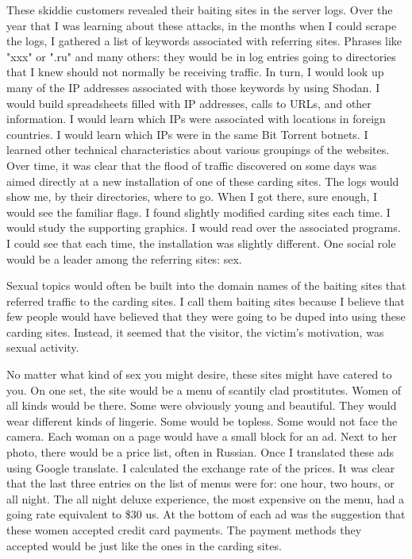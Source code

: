 These skiddie customers revealed their baiting sites in the server logs.  Over the year that I was learning about these attacks, in the months when I could scrape the logs, I gathered a list of keywords associated with referring sites.  Phrases like "xxx" or ".ru" and many others:  they would be in log entries going to directories that I knew should not normally be receiving traffic.  In turn, I would look up many of the IP addresses associated with those keywords by using Shodan.  I would build spreadsheets filled with IP addresses, calls to URLs, and other information.  I would learn which IPs were associated with locations in foreign countries.  I would learn which IPs were in the same Bit Torrent botnets.  I learned other technical characteristics about various groupings of the websites.  Over time, it was clear that the flood of traffic discovered on some days was aimed directly at a new installation of one of these carding sites.  The logs would show me, by their directories, where to go.  When I got there, sure enough, I would see the familiar flags.  I found slightly modified carding sites each time.  I would study the supporting graphics.  I would read over the associated programs.  I could see that each time, the installation was slightly different.  One social role would be a leader among the referring sites:  sex.

Sexual topics would often be built into the domain names of the baiting sites that referred traffic to the carding sites.  I call them baiting sites because I believe that few people would have believed that they were going to be duped into using these carding sites.  Instead, it seemed that the visitor, the victim's motivation, was sexual activity.

No matter what kind of sex you might desire, these sites might have catered to you.  On one set, the site would be a menu of scantily clad prostitutes.  Women of all kinds would be there.  Some were obviously young and beautiful.  They would wear different kinds of lingerie.  Some would be topless.  Some would not face the camera.  Each woman on a page would have a small block for an ad.  Next to her photo, there would be a price list, often in Russian.  Once I translated these ads using Google translate.  I calculated the exchange rate of the prices.  It was clear that the last three entries on the list of menus were for:  one hour, two hours, or all night.  The all night deluxe experience, the most expensive on the menu, had a going rate equivalent to \$30 \gls{us}.  At the bottom of each ad was the suggestion that these women accepted credit card payments.  The payment methods they accepted would be just like the ones in the carding sites.

